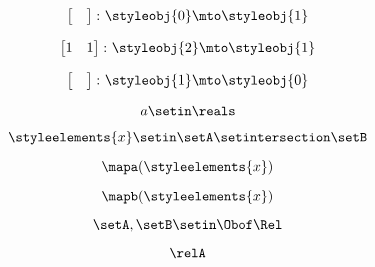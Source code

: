 {\begin{forslides}
        \begin{equation}
            \label{eq:parallelism-112}
            \begin{bmatrix}
                \quad
            \end{bmatrix}
            \colon \styleobj{0} \mto \styleobj{1}
        \end{equation}

        \begin{equation}
            \label{eq:parallelism-113}
            \begin{bmatrix}
                1 & 1
            \end{bmatrix}
            \colon \styleobj{2} \mto \styleobj{1}
        \end{equation}

        \begin{equation}
            \label{eq:parallelism-114}
            \begin{bmatrix}
                \quad
            \end{bmatrix}
            \colon \styleobj{1} \mto \styleobj{0}
        \end{equation}

        \begin{equation}
            \label{eq:parallelism-115}
            a \setin \reals
        \end{equation}

        \begin{equation}
            \label{eq:parallelism-116}
            \styleelements{x}\setin \setA\setintersection \setB
        \end{equation}

        \begin{equation}
            \label{eq:parallelism-117}
            \mapa(\styleelements{x})
        \end{equation}

        \begin{equation}
            \label{eq:parallelism-118}
            \mapb(\styleelements{x})
        \end{equation}

        \begin{equation}
            \label{eq:parallelism-119}
            \setA,\setB\setin \Obof\Rel
        \end{equation}

        \begin{equation}
            \label{eq:parallelism-120}
            \relA
        \end{equation}


\end{forslides}}

